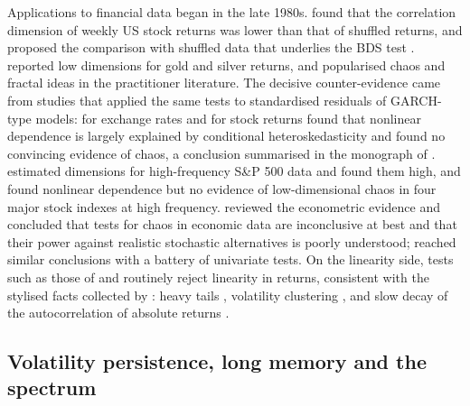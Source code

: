 \documentclass[11pt,a4paper]{article}
\begin{document}
Applications to financial data began in the late 1980s. \citet{ScheinkmanLeBaron1989} found that the correlation
dimension of weekly US stock returns was lower than that of shuffled returns, and proposed the comparison with
shuffled data that underlies the BDS test \citep{BDS1996}. \citet{FrankStengos1989} reported low dimensions for gold
and silver returns, and \citet{Peters1991} popularised chaos and fractal ideas in the practitioner literature.
The decisive counter-evidence came from studies that applied the same tests to standardised residuals of GARCH-type
models: \citet{Hsieh1989} for exchange rates and \citet{Hsieh1991} for stock returns found that nonlinear dependence
is largely explained by conditional heteroskedasticity and found no convincing evidence of chaos, a conclusion
summarised in the monograph of \citet{BrockHsiehLeBaron1991}. \citet{MayfieldMizrach1992} estimated dimensions for
high-frequency S\&P 500 data and found them high, and \citet{Abhyankar1997} found nonlinear dependence but no
evidence of low-dimensional chaos in four major stock indexes at high frequency. \citet{BarnettSerletis2000}
reviewed the econometric evidence and concluded that tests for chaos in economic data are inconclusive at best and
that their power against realistic stochastic alternatives is poorly understood; \citet{KyrtsouSerletis2006}
reached similar conclusions with a battery of univariate tests. On the linearity side, tests such as those of
\citet{Hinich1982} and \citet{Tsay1986} routinely reject linearity in returns, consistent with the stylised facts
collected by \citet{Cont2001}: heavy tails \citep{Mandelbrot1963}, volatility clustering
\citep{Engle1982,Bollerslev1986,Bollerslev1987}, and slow decay of the autocorrelation of absolute returns
\citep{DingGrangerEngle1993}.

\subsection{Volatility persistence, long memory and the spectrum}
\end{document}
